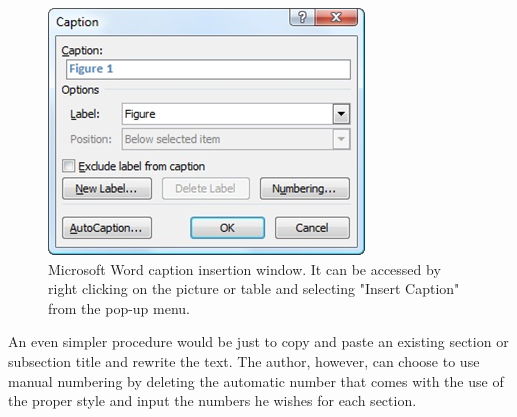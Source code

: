 \documentclass[10pt]{style_src/imeko_acta}
\begin{document}
\begin{figure}[!tb]
	\centering
	\includegraphics[width=.955\columnwidth]{image3}
	\caption{Microsoft Word caption insertion window. It can be accessed by right clicking on the picture or table and selecting "Insert Caption" from the pop-up menu.}
	\label{fig:image3}
\end{figure}

An even simpler procedure would be just to copy and paste an existing section or subsection title and rewrite the text. The author, however, can choose to use manual numbering by deleting the automatic number that comes with the use of the proper style and input the numbers he wishes for each section.
\end{document}
